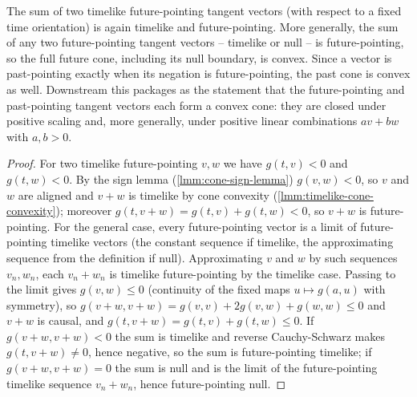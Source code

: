 \begin{lemma}
    \label{lmm:future-cone-convexity}
    \leanok
    The sum of two timelike future-pointing tangent vectors (with respect to a fixed time orientation) is again timelike and future-pointing. More generally, the sum of any two future-pointing tangent vectors -- timelike or null -- is future-pointing, so the full future cone, including its null boundary, is convex. Since a vector is past-pointing exactly when its negation is future-pointing, the past cone is convex as well. Downstream this packages as the statement that the future-pointing and past-pointing tangent vectors each form a convex cone: they are closed under positive scaling and, more generally, under positive linear combinations $a v + b w$ with $a, b > 0$.
\end{lemma}
\begin{proof}
    \leanok
    For two timelike future-pointing $v, w$ we have $g(t,v) < 0$ and $g(t,w) < 0$. By the sign lemma (\ref{lmm:cone-sign-lemma}) $g(v,w) < 0$, so $v$ and $w$ are aligned and $v + w$ is timelike by cone convexity (\ref{lmm:timelike-cone-convexity}); moreover $g(t, v+w) = g(t,v) + g(t,w) < 0$, so $v + w$ is future-pointing. For the general case, every future-pointing vector is a limit of future-pointing timelike vectors (the constant sequence if timelike, the approximating sequence from the definition if null). Approximating $v$ and $w$ by such sequences $v_n, w_n$, each $v_n + w_n$ is timelike future-pointing by the timelike case. Passing to the limit gives $g(v,w) \le 0$ (continuity of the fixed maps $u \mapsto g(a,u)$ with symmetry), so $g(v+w,v+w) = g(v,v) + 2g(v,w) + g(w,w) \le 0$ and $v+w$ is causal, and $g(t,v+w) = g(t,v) + g(t,w) \le 0$. If $g(v+w,v+w) < 0$ the sum is timelike and reverse Cauchy-Schwarz makes $g(t,v+w) \ne 0$, hence negative, so the sum is future-pointing timelike; if $g(v+w,v+w) = 0$ the sum is null and is the limit of the future-pointing timelike sequence $v_n + w_n$, hence future-pointing null.
\end{proof}


